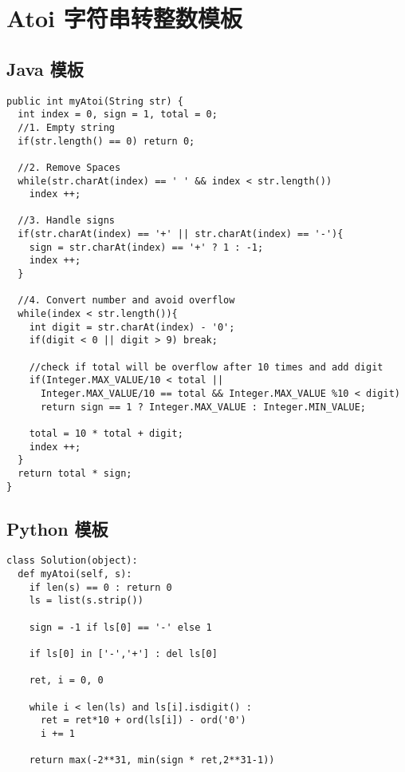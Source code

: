 \newpage
\section{Atoi 字符串转整数模板}

\subsection{Java 模板}

\begin{verbatim}
public int myAtoi(String str) {
  int index = 0, sign = 1, total = 0;
  //1. Empty string
  if(str.length() == 0) return 0;

  //2. Remove Spaces
  while(str.charAt(index) == ' ' && index < str.length())
    index ++;

  //3. Handle signs
  if(str.charAt(index) == '+' || str.charAt(index) == '-'){
    sign = str.charAt(index) == '+' ? 1 : -1;
    index ++;
  }

  //4. Convert number and avoid overflow
  while(index < str.length()){
    int digit = str.charAt(index) - '0';
    if(digit < 0 || digit > 9) break;

    //check if total will be overflow after 10 times and add digit
    if(Integer.MAX_VALUE/10 < total ||
      Integer.MAX_VALUE/10 == total && Integer.MAX_VALUE %10 < digit)
      return sign == 1 ? Integer.MAX_VALUE : Integer.MIN_VALUE;

    total = 10 * total + digit;
    index ++;
  }
  return total * sign;
}
\end{verbatim}

\subsection{Python 模板}

\begin{verbatim}
class Solution(object):
  def myAtoi(self, s):
    if len(s) == 0 : return 0
    ls = list(s.strip())

    sign = -1 if ls[0] == '-' else 1

    if ls[0] in ['-','+'] : del ls[0]

    ret, i = 0, 0

    while i < len(ls) and ls[i].isdigit() :
      ret = ret*10 + ord(ls[i]) - ord('0')
      i += 1

    return max(-2**31, min(sign * ret,2**31-1))
\end{verbatim}
